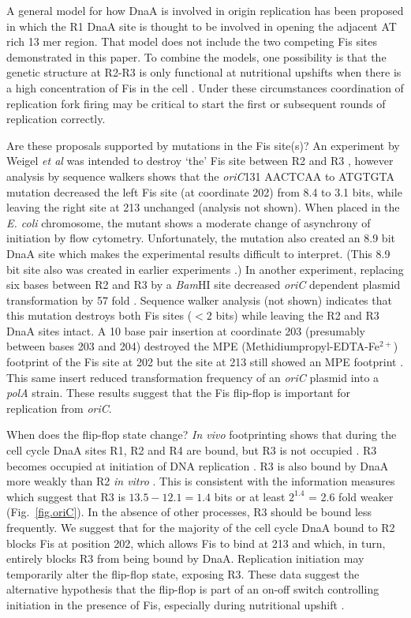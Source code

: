 \documentclass[doublespacing]{narfront}
\newcommand{\fig}[1]{Fig.~\ref{#1}} %
\begin{document}
A general model for how DnaA is involved in
origin replication has been proposed
\cite{Speck.Messer2001,Messer.Zakrzewska-Czerwinska2001}
in which
the R1 DnaA site is thought to be involved
in opening the
adjacent AT rich 13 mer region.
That model does not include
the two competing Fis sites demonstrated in this paper.
To combine the models, one possibility is that
the genetic structure at R2-R3 is only functional
at nutritional upshifts when there is a high
concentration of Fis in the cell
\cite{Ball1992}.
Under these circumstances coordination
of replication fork firing may be critical
to start the first or subsequent rounds of replication
correctly.

Are these  proposals supported by mutations in the Fis site(s)?
An experiment by Weigel \emph{et al}
was intended to destroy `the' Fis site
between R2 and R3
\cite{Weigel.Boye2001}, however
analysis by sequence walkers
shows that the \emph{oriC}131 AACTCAA to ATGTGTA
mutation decreased the left Fis site (at coordinate 202)
from 8.4 to 3.1 bits, while leaving the right
site at 213 unchanged
(analysis not shown).
When placed in the \emph{E. coli} chromosome,
the mutant shows a moderate change of
asynchrony of initiation by flow cytometry.
Unfortunately, the mutation also created an 8.9 bit DnaA site
which makes the experimental results difficult to interpret.
(This 8.9 bit site also was created
in earlier experiments \cite{Roth1994}.)
In another experiment,
replacing six bases between R2 and R3 by a \emph{Bam}HI site
decreased \emph{oriC} dependent plasmid
transformation by 57 fold \cite{Crooke.Kornberg1993}.
Sequence walker analysis (not shown) indicates that this mutation
destroys both Fis sites ($< 2$ bits)
while leaving the R2 and R3 DnaA sites intact.
A 10 base pair insertion at coordinate 203
(presumably between bases 203 and 204)
destroyed the MPE
(Methidiumpropyl-EDTA-Fe${}^{2+}$)
footprint of the Fis site at 202
but the site at 213 still showed an MPE footprint
\cite{Messer1992}.
This same insert reduced transformation frequency of
an \emph{oriC} plasmid into a \emph{polA} strain.
These results suggest
that the Fis flip-flop is important for replication from \emph{oriC}.

When does the flip-flop state change?
\emph{In vivo} footprinting shows that
during the cell cycle DnaA sites R1, R2 and R4 are bound,
but R3 is not
occupied
\cite{Samitt1989}.
R3 becomes occupied at initiation of DNA replication
\cite{Cassler.Leonard1995}.
R3 is also bound by DnaA more weakly than R2 \emph{in vitro}
\cite{Margulies.Kaguni1996,Weigel.Messer1997}.
This is consistent with the information measures which suggest that
R3 is $13.5 - 12.1 = 1.4$ bits or at least $2^{1.4}$ = 2.6 fold weaker
(\fig{fig.oriC}).
In the absence of other processes, R3 should be bound less frequently.
We suggest that
for the majority of the cell cycle
DnaA bound to
R2 blocks Fis at position 202,
which allows Fis to bind at 213 and which, in turn,
entirely blocks R3 from being bound by DnaA.
Replication initiation may temporarily alter the flip-flop state,
exposing R3.
These data suggest the alternative hypothesis that the flip-flop
is part of an on-off switch controlling initiation in the presence of Fis,
especially during nutritional upshift \cite{Ball1992}.
\end{document}
